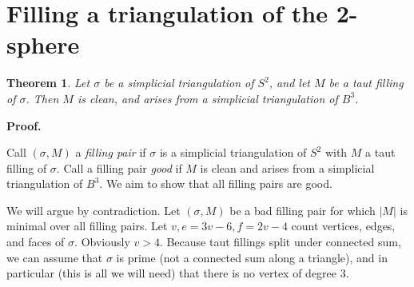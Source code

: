 \documentclass[12pt]{article}
\newtheorem{theorem}{Theorem}
\newcommand{\proofstart}{{\noindent \bf Proof.\ }}
\def\del{\partial}
\newcommand{\kw}{\mathrm}
\newcommand{\link}{\kw{link}}
\begin{document}

\section{Filling a triangulation of the 2-sphere}

\begin{theorem} \label{th2}
Let $\sigma$ be a simplicial triangulation of $S^2$,
and let $M$ be a taut filling of $\sigma$.
Then $M$ is clean, and arises from
a simplicial triangulation of $B^3$.
\end{theorem}

\proofstart

Call $(\sigma,M)$ a \emph{filling pair} if $\sigma$ is a simplicial triangulation
of $S^2$ with $M$ a taut filling of $\sigma$.
Call a filling pair \emph{good}
if $M$ is clean and arises from a simplicial triangulation of $B^3$.
We aim to show that all filling pairs are good.

We will argue by contradiction.
Let $(\sigma,M)$ be a bad filling pair for which
$|M|$ is minimal over all filling pairs.
Let $v,e=3v-6,f=2v-4$ count vertices, edges, and faces of $\sigma$.
Obviously $v>4$.
Because taut fillings split under connected sum,
we can assume that $\sigma$ is prime
(not a connected sum along a triangle),
and in particular (this is all we will need) that there is no
vertex of degree $3$.
\end{document}
